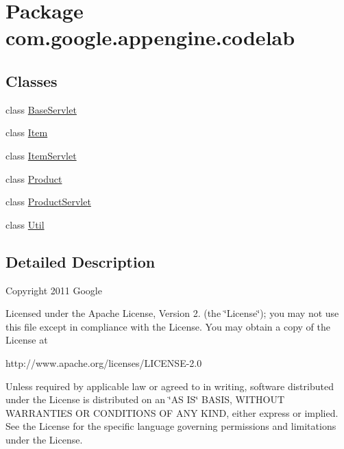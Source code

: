 \hypertarget{namespacecom_1_1google_1_1appengine_1_1codelab}{\section{Package com.\-google.\-appengine.\-codelab}
\label{namespacecom_1_1google_1_1appengine_1_1codelab}
}
\subsection*{Classes}
\begin{DoxyCompactItemize}
\item 
class \hyperlink{classcom_1_1google_1_1appengine_1_1codelab_1_1_base_servlet}{Base\-Servlet}
\item 
class \hyperlink{classcom_1_1google_1_1appengine_1_1codelab_1_1_item}{Item}
\item 
class \hyperlink{classcom_1_1google_1_1appengine_1_1codelab_1_1_item_servlet}{Item\-Servlet}
\item 
class \hyperlink{classcom_1_1google_1_1appengine_1_1codelab_1_1_product}{Product}
\item 
class \hyperlink{classcom_1_1google_1_1appengine_1_1codelab_1_1_product_servlet}{Product\-Servlet}
\item 
class \hyperlink{classcom_1_1google_1_1appengine_1_1codelab_1_1_util}{Util}
\end{DoxyCompactItemize}


\subsection{Detailed Description}
Copyright 2011 Google

Licensed under the Apache License, Version 2. (the \char`\"{}\-License\char`\"{}); you may not use this file except in compliance with the License. You may obtain a copy of the License at \begin{DoxyVerb}http://www.apache.org/licenses/LICENSE-2.0\end{DoxyVerb}
 Unless required by applicable law or agreed to in writing, software distributed under the License is distributed on an \char`\"{}\-A\-S I\-S\char`\"{} B\-A\-S\-I\-S, W\-I\-T\-H\-O\-U\-T W\-A\-R\-R\-A\-N\-T\-I\-E\-S O\-R C\-O\-N\-D\-I\-T\-I\-O\-N\-S O\-F A\-N\-Y K\-I\-N\-D, either express or implied. See the License for the specific language governing permissions and limitations under the License. 
